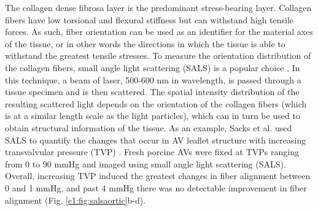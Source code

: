     The collagen dense fibrosa layer is the predominant stress-bearing layer. Collagen fibers have low torsional and flexural stiffness but can withstand high tensile forces. As such, fiber orientation can be used as an identifier for the material axes of the tissue, or in other words the directions in which the tissue is able to withstand the greatest tensile stresses. To measure the orientation distribution of the collagen fibers, small angle light scattering (SALS) is a popular choice \cite{sacks_small_1997}. In this technique, a beam of laser, 500-600 nm in wavelength, is passed through a tissue specimen and is then scattered. The spatial intensity distribution of the resulting scattered light depends on the orientation of the collagen fibers (which is at a similar length scale as the light particles), which can in turn be used to obtain structural information of the tissue. As an example, Sacks et al. used SALS to quantify the changes that occur in AV leaflet structure with increasing transvalvular pressure (TVP) \cite{sacks_aortic_1998}.  Fresh porcine AVs were fixed at TVPs ranging from 0 to 90 mmHg and imaged using small angle light scattering (SALS). Overall, increasing TVP induced the greatest changes in fiber alignment between 0 and 1 mmHg, and past 4 mmHg there was no detectable improvement in fiber alignment (Fig. \ref{c1:fig:salsaortic}b-d). 
    
